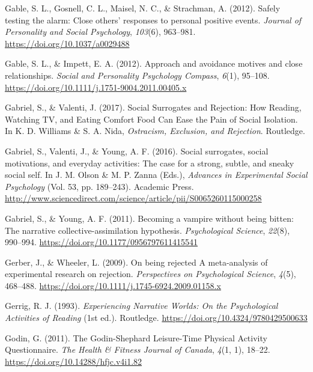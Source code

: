 \documentclass[
]{udthesis}
\newlength{\cslhangindent}
\newenvironment{CSLReferences}[2] %
 {\begin{list}{}{%
  \setlength{\itemindent}{0pt}
  \setlength{\leftmargin}{0pt}
  \setlength{\parsep}{0pt}
  \ifodd #1
   \setlength{\leftmargin}{\cslhangindent}
   \setlength{\itemindent}{-1\cslhangindent}
  \fi
  \setlength{\itemsep}{#2\baselineskip}}}
 {\end{list}}
\begin{document}
\begin{CSLReferences}{1}{0}
Gable, S. L., Gosnell, C. L., Maisel, N. C., \& Strachman, A. (2012). Safely testing the alarm: Close others' responses to personal positive events. \emph{Journal of Personality and Social Psychology}, \emph{103}(6), 963--981. \url{https://doi.org/10.1037/a0029488}

Gable, S. L., \& Impett, E. A. (2012). Approach and avoidance motives and close relationships. \emph{Social and Personality Psychology Compass}, \emph{6}(1), 95--108. \url{https://doi.org/10.1111/j.1751-9004.2011.00405.x}

Gabriel, S., \& Valenti, J. (2017). Social {Surrogates} and {Rejection}: {How Reading}, {Watching TV}, and {Eating Comfort Food Can Ease} the {Pain} of {Social Isolation}. In K. D. Williams \& S. A. Nida, \emph{Ostracism, {Exclusion}, and {Rejection}}. {Routledge}.

Gabriel, S., Valenti, J., \& Young, A. F. (2016). Social surrogates, social motivations, and everyday activities: {The} case for a strong, subtle, and sneaky social self. In J. M. Olson \& M. P. Zanna (Eds.), \emph{Advances in {Experimental Social Psychology}} (Vol. 53, pp. 189--243). {Academic Press}. \url{http://www.sciencedirect.com/science/article/pii/S0065260115000258}

Gabriel, S., \& Young, A. F. (2011). Becoming a vampire without being bitten: {The} narrative collective-assimilation hypothesis. \emph{Psychological Science}, \emph{22}(8), 990--994. \url{https://doi.org/10.1177/0956797611415541}

Gerber, J., \& Wheeler, L. (2009). On being rejected {A} meta-analysis of experimental research on rejection. \emph{Perspectives on Psychological Science}, \emph{4}(5), 468--488. \url{https://doi.org/10.1111/j.1745-6924.2009.01158.x}

Gerrig, R. J. (1993). \emph{Experiencing Narrative Worlds: On the Psychological Activities of Reading} (1st ed.). Routledge. \url{https://doi.org/10.4324/9780429500633}

Godin, G. (2011). The {Godin}-{Shephard Leisure}-{Time Physical Activity Questionnaire}. \emph{The Health \& Fitness Journal of Canada}, \emph{4}(1, 1), 18--22. \url{https://doi.org/10.14288/hfjc.v4i1.82}


\end{CSLReferences}
\end{document}
